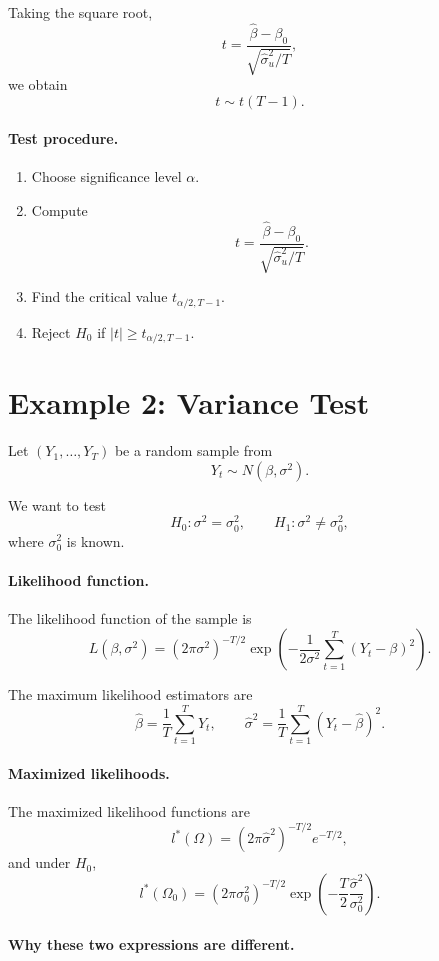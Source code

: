 Taking the square root,
\[
t
=
\frac{\hat{\beta}-\beta_0}{\sqrt{\hat{\sigma}_u^2/T}},
\]
we obtain
\[
t \sim t(T-1).
\]

\paragraph{Test procedure.}

\begin{enumerate}
\item Choose significance level $\alpha$.
\item Compute
\[
t = \frac{\hat{\beta}-\beta_0}{\sqrt{\hat{\sigma}_u^2/T}}.
\]
\item Find the critical value $t_{\alpha/2,T-1}$.
\item Reject $H_0$ if $|t| \ge t_{\alpha/2,T-1}$.
\end{enumerate}
\section{Example 2: Variance Test}

Let $(Y_1,\dots,Y_T)$ be a random sample from
\[
Y_t \sim N(\beta,\sigma^2).
\]

We want to test
\[
H_0:\sigma^2=\sigma_0^2,
\qquad
H_1:\sigma^2\neq\sigma_0^2,
\]
where $\sigma_0^2$ is known.

\paragraph{Likelihood function.}

The likelihood function of the sample is
\[
L(\beta,\sigma^2)
=
(2\pi\sigma^2)^{-T/2}
\exp\!\left(
-\frac{1}{2\sigma^2}
\sum_{t=1}^T (Y_t-\beta)^2
\right).
\]

The maximum likelihood estimators are
\[
\hat{\beta} = \frac{1}{T}\sum_{t=1}^T Y_t,
\qquad
\hat{\sigma}^2 = \frac{1}{T}\sum_{t=1}^T (Y_t-\hat{\beta})^2.
\]

\paragraph{Maximized likelihoods.}

The maximized likelihood functions are
\[
l^*(\Omega)
=
(2\pi\hat{\sigma}^2)^{-T/2} e^{-T/2},
\]
and under $H_0$,
\[
l^*(\Omega_0)
=
(2\pi\sigma_0^2)^{-T/2}
\exp\!\left(
-\frac{T}{2}\frac{\hat{\sigma}^2}{\sigma_0^2}
\right).
\]

\paragraph{Why these two expressions are different.}

